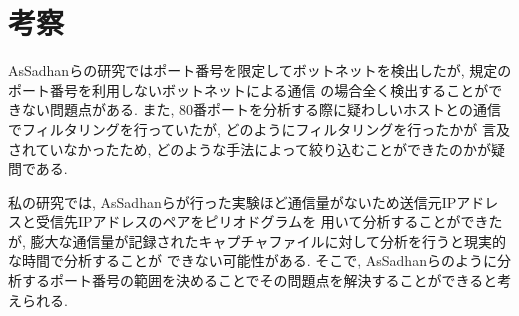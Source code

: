 \documentclass[twocolumn,9]{ltjsarticle}
\begin{document}
\section{考察}
AsSadhanらの研究ではポート番号を限定してボットネットを検出したが, 規定のポート番号を利用しないボットネットによる通信
の場合全く検出することができない問題点がある. 
また, 80番ポートを分析する際に疑わしいホストとの通信でフィルタリングを行っていたが, どのようにフィルタリングを行ったかが
言及されていなかったため, どのような手法によって絞り込むことができたのかが疑問である. 

私の研究では, AsSadhanらが行った実験ほど通信量がないため送信元IPアドレスと受信先IPアドレスのペアをピリオドグラムを
用いて分析することができたが, 膨大な通信量が記録されたキャプチャファイルに対して分析を行うと現実的な時間で分析することが
できない可能性がある. 
そこで, AsSadhanらのように分析するポート番号の範囲を決めることでその問題点を解決することができると考えられる. 




\end{document}
